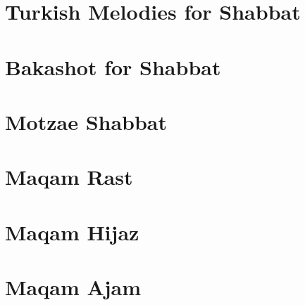 \documentclass[letterpaper]{memoir}
\newcommand{\song}[2]{}
\begin{document}
\chapter{Turkish Melodies for Shabbat}
\song{Yoducha Rayonai}{Yoducha_Rayonai_Turkish_with_octave_up.pdf}
\song{Yom HaShabbat Ein Kamohu}{Yom_HaShabbat_Ein_Kamohu_Turkish.pdf}
\song{Ki Eshmerah Shabbat}{Ki_Eshmerah_Shabbat_Turkish.pdf}

\chapter{Bakashot for Shabbat}
\song{Yom Zeh Shiru La'el}{Yom_Zeh_Shiru_Lael.pdf}
\song{Yoducha Rayonai}{Yoducha_Rayonai.pdf}
\song{Yoducha Rayonai \#2}{Yoducha_Rayonai_2.pdf}
\song{Yedid Nefesh}{Yedid_Nefesh.pdf}
\song{Agadelcha}{Agadelcha.pdf}

\chapter{Motzae Shabbat}
\song{Al Tira Avdi Yaakov}{Al_Tira_Avdi_Yaakov.pdf}
\song{Al Bayit Zeh}{Al_Bayit_Zeh.pdf}

\chapter{Maqam Rast}
\song{Eli Yah Eli}{Eli_Yah_Eli.pdf} %
\song{Riva Riva}{Riva_Riva.pdf}
\song{Boee B'rinah}{Boee_Brinah.pdf}
\song{N'imah Li}{Nimah_Li.pdf}
\song{Rachum Bach Yagel Levavi}{Rachum_Bach_Yagel_Levavi.pdf}

\chapter{Maqam Hijaz}
\song{Ana b'Chasdecha}{Ana_bChasdecha.pdf}
\song{Eleicha Ekra Yah}{Eleicha_Ekra_Yah.pdf}
\song{Ochil Yom Yom Yerushalyim}{Ochil_Yom_Yom_Yerushalyim.pdf}
\song{Ozrenei El Chai}{Ozrenei_El_Chai.pdf}

\chapter{Maqam Ajam}
\song{Refa Tziri}{Refa_Tziri.pdf}
\song{Ani Likrat}{Ani_Likrat.pdf}
\song{Ani Alayich Ayuma}{Ani_Alayich_Ayuma.pdf}
\song{Yinon Shemo}{Yinon_Shemo.pdf}
\song{El Galil}{El_Galil.pdf}
\song{Kol Et Eleicha}{Kol_Et_Eleicha.pdf}
\song{Halleluyah Tehillim 150}{Halleluyah_Tehillim_150.pdf}
\end{document}
